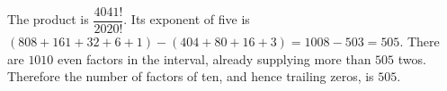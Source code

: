 The product is $\dfrac{4041!}{2020!}$. Its exponent of five is $(808+161+32+6+1)-(404+80+16+3)=1008-503=505$. There are $1010$ even factors in the interval, already supplying more than $505$ twos. Therefore the number of factors of ten, and hence trailing zeros, is $\boxed{505}$.
